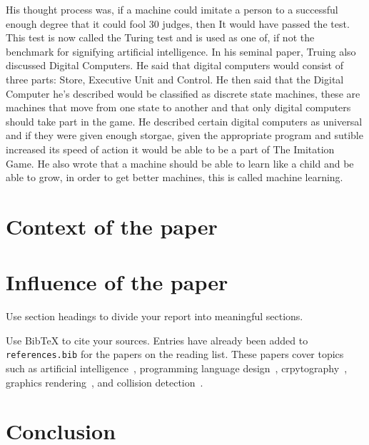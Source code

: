\documentclass{article}
\begin{document}
His thought process was, if a machine could imitate a person to a successful enough degree that it could fool 30%
judges, then It would have passed the test. This test is now called the Turing test and is used as one of, if not the 
benchmark for signifying artificial intelligence. In his seminal paper, Truing also discussed Digital Computers. He 
said that digital computers would consist of three parts: Store, Executive Unit and Control. He then said that the 
Digital Computer he’s described would be classified as discrete state machines, these are machines that move from one 
state to another and that only digital computers should take part in the game. He described certain digital computers as 
universal and if they were given enough storgae, given the appropriate program and sutible increased its speed of action it would be able to be a part of The Imitation Game. He also wrote that a machine should be able to learn like a child and be able to grow, in order to get better machines, this is called machine learning.

\section{Context of the paper}

\section{Influence of the paper}

Use section headings to divide your report into meaningful sections.

Use BibTeX to cite your sources. Entries have already been added to \texttt{references.bib} for the papers on the reading list.
These papers cover topics such as artificial intelligence~\cite{turing1950_intelligence, knuth1975_alphabeta}, programming language design~\cite{dijkstra1968_goto}, crpytography~\cite{rivest1978_rsa}, graphics rendering~\cite{phong1975_illumination}, and collision detection~\cite{gilbert1988_gjk}.

\section{Conclusion}
\end{document}
